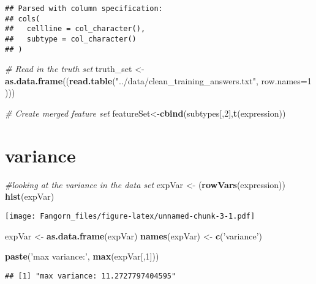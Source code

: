 \documentclass[]{article}
\newenvironment{Shaded}{\begin{snugshade}}{\end{snugshade}}
\newcommand{\KeywordTok}[1]{\textcolor[rgb]{0.13,0.29,0.53}{\textbf{#1}}}
\newcommand{\DataTypeTok}[1]{\textcolor[rgb]{0.13,0.29,0.53}{#1}}
\newcommand{\DecValTok}[1]{\textcolor[rgb]{0.00,0.00,0.81}{#1}}
\newcommand{\StringTok}[1]{\textcolor[rgb]{0.31,0.60,0.02}{#1}}
\newcommand{\CommentTok}[1]{\textcolor[rgb]{0.56,0.35,0.01}{\textit{#1}}}
\newcommand{\NormalTok}[1]{#1}
\begin{document}
\begin{verbatim}
## Parsed with column specification:
## cols(
##   cellline = col_character(),
##   subtype = col_character()
## )
\end{verbatim}

\begin{Shaded}
\begin{Highlighting}[]
\CommentTok{# Read in the truth set}
\NormalTok{truth_set <-}\StringTok{  }\KeywordTok{as.data.frame}\NormalTok{((}\KeywordTok{read.table}\NormalTok{(}\StringTok{"../data/clean_training_answers.txt"}\NormalTok{, }\DataTypeTok{row.names=}\DecValTok{1}\NormalTok{ )))}


\CommentTok{# Create merged feature set}
\NormalTok{featureSet<-}\KeywordTok{cbind}\NormalTok{(subtypes[,}\DecValTok{2}\NormalTok{],}\KeywordTok{t}\NormalTok{(expression))}
\end{Highlighting}
\end{Shaded}

\section{variance}\label{variance}

\begin{Shaded}
\begin{Highlighting}[]
\CommentTok{#looking at the variance in the data set}
\NormalTok{expVar <-}\StringTok{ }\NormalTok{(}\KeywordTok{rowVars}\NormalTok{(expression))}
\KeywordTok{hist}\NormalTok{(expVar)}
\end{Highlighting}
\end{Shaded}

\texttt{[image: Fangorn\_files/figure-latex/unnamed-chunk-3-1.pdf]}

\begin{Shaded}
\begin{Highlighting}[]
\NormalTok{expVar <-}\StringTok{ }\KeywordTok{as.data.frame}\NormalTok{(expVar)}
\KeywordTok{names}\NormalTok{(expVar) <-}\StringTok{ }\KeywordTok{c}\NormalTok{(}\StringTok{'variance'}\NormalTok{)}

\KeywordTok{paste}\NormalTok{(}\StringTok{'max variance:'}\NormalTok{, }\KeywordTok{max}\NormalTok{(expVar[,}\DecValTok{1}\NormalTok{]))}
\end{Highlighting}
\end{Shaded}

\begin{verbatim}
## [1] "max variance: 11.2727797404595"
\end{verbatim}
\end{document}
